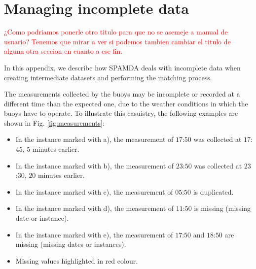 \documentclass[energies,article,submit,moreauthors,pdftex]{Definitions/mdpi}
\begin{document}

\appendix
\section{Managing incomplete data}\label{app:AppendixA}

        \textcolor{red}{¿Como podriamos ponerle otro titulo para que no se asemeje a manual de usuario? Tenemos que mirar a ver si podemos tambien cambiar el titulo de alguna otra seccion en cuanto a ese fin.}
        
		In this appendix, we describe how SPAMDA deals with incomplete data when creating intermediate datasets and performing the matching process.
		
		The measurements collected by the buoys may be incomplete or recorded at a different time than the expected one, due to the weather conditions in which the buoys have to operate. To illustrate this casuistry, the following examples are shown in Fig. \ref{fig:measurements}:		
		\begin{itemize}
			\item In the instance marked with a), the measurement of $17$:$50$ was collected at $17$:$45$, $5$ minutes earlier.
			\item In the instance marked with b), the measurement of $23$:$50$ was collected at $23$:$30$, $20$ minutes earlier.
			\item In the instance marked with c), the measurement of $05$:$50$ is duplicated.
			\item In the instance marked with d), the measurement of $11$:$50$ is missing (missing date or instance).
			\item In the instance marked with e), the measurement of $17$:$50$ and $18$:$50$ are missing (missing dates or instances).
			\item Missing values highlighted in red colour.
		\end{itemize}
		
\end{document}
